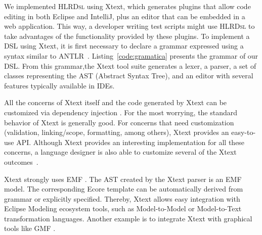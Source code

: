 \documentclass[AMA,STIX1COL]{WileyNJD-v2}
\newcommand{\hlrdsl}{\textsc{HLRDsl}\xspace}
\begin{document}
We implemented \hlrdsl  using Xtext, which generates plugins that allow code editing in both Eclipse and IntelliJ, plus an editor that can be embedded in a web application. This way, a developer writing test scripts might use \hlrdsl to take advantages of the functionality provided by these plugins. To implement a DSL using Xtext, it is first necessary to declare a grammar expressed using a syntax similar to ANTLR~\cite{parr2013}. Listing~\ref{code:gramatica} presents the grammar of our DSL. From this grammar,the Xtext tool suite generates a lexer, a parser, a set of classes representing the AST (Abstract Syntax Tree), and an editor with several features typically available in IDEs.



All the concerns of Xtext itself and the code generated by Xtext can be customized via dependency injection \cite{prasanna2009}. For the most worrying, the standard behavior of Xtext is generally good. For concerns that need customization (validation, linking/scope, formatting, among others), Xtext provides an easy-to-use API. Although Xtext provides an interesting implementation for all these concerns, a language designer is also able to customize several of the Xtext outcomes~\cite{bettini2016}.


Xtext strongly uses EMF \cite{blewitt2013}. The AST created by the Xtext parser is an EMF model. The corresponding Ecore template can be automatically derived from grammar or explicitly specified. Thereby, Xtext allows easy integration with Eclipse Modeling ecosystem tools, such as Model-to-Model or Model-to-Text transformation languages. Another example is to integrate Xtext with graphical tools like GMF \cite{eysholdt2010}.
\end{document}
